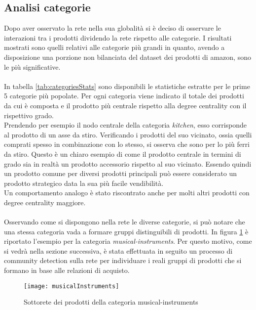 \subsection{Analisi categorie}
Dopo aver osservato la rete nella sua globalità si è deciso di osservare le interazioni tra i prodotti dividendo la rete rispetto alle categorie. I risultati mostrati sono quelli relativi alle categorie più grandi in quanto, avendo a disposizione una porzione non bilanciata del dataset dei prodotti di amazon, sono le più significative. 
\\\\
In tabella \ref{tab:categoriesStats} sono disponibili le statistiche estratte per le prime 5 categorie più popolate. Per ogni categoria viene indicato il totale dei prodotti da cui è composta e il prodotto più centrale rispetto alla degree centrality con il rispettivo grado. \\
Prendendo per esempio il nodo centrale della categoria \textit{kitchen}, esso corrisponde al prodotto di un asse da stiro. Verificando i prodotti del suo vicinato, ossia quelli comprati spesso in combinazione con lo stesso, si osserva che sono per lo più ferri da stiro. Questo è un chiaro esempio di come il prodotto centrale in termini di grado sia in realtà un prodotto accessorio rispetto al suo vicinato. Essendo quindi un prodotto comune per diversi prodotti principali può essere considerato un prodotto strategico data la sua più facile vendibilità. \\
Un comportamento analogo è stato riscontrato anche per molti altri prodotti con degree centrality maggiore.
\\\\
Osservando come si dispongono nella rete le diverse categorie, si può notare che una stessa categoria vada a formare gruppi distinguibili di prodotti. In figura \ref{fig:musicalInstruments} è riportato l'esempio per la categoria \textit{musical-instruments}. Per questo motivo, come si vedrà nella sezione successiva, è stata effettuata in seguito un processo di community detection sulla rete per individuare i reali gruppi di prodotti che si formano in base alle relazioni di acquisto.

\begin{figure}[]
    \texttt{[image: musicalInstruments]}\centering
    \caption{Sottorete dei prodotti della categoria musical-instruments}\label{fig:musicalInstruments}
\end{figure}

